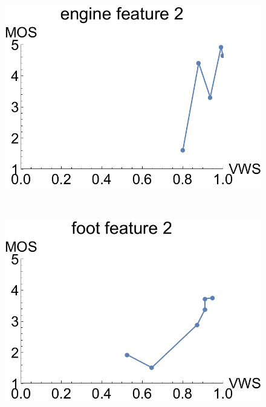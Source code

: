 \begin{figure}
	\centering
	\begin{minipage}{.25\textwidth}
		\includegraphics[width=1\linewidth]{figures/mos_vs_metric_engine_feature_2}
		\subcaption{}
	\end{minipage}~
	\begin{minipage}{.25\textwidth}
		\includegraphics[width=1\linewidth]{figures/mos_vs_metric_foot_feature_2}
		\subcaption{}
	\end{minipage}~
	\begin{minipage}{.25\textwidth}

\end{minipage}
\end{figure}
